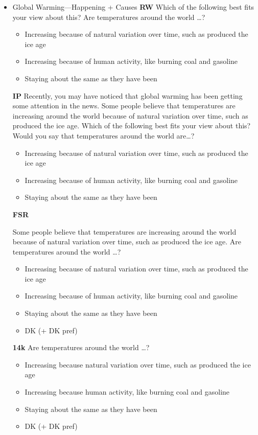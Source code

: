 \documentclass[12pt, letterpaper]{article}
\begin{document}
\begin{itemize}
\item Global Warming—Happening + Causes\newline
\textbf{RW}\newline
Which of the following best fits your view about this? Are temperatures around the
world \ldots?
\begin{itemize}
	\item Increasing because of natural variation over time, such as produced the ice age
	\item Increasing because of human activity, like burning coal and gasoline
	\item Staying about the same as they have been
\end{itemize}

\textbf{IP}\newline
Recently, you may have noticed that global warming has been getting some attention
in the news. Some people believe that temperatures are increasing around the world
because of natural variation over time, such as produced the ice age. Which of the
following best fits your view about this? Would you say that temperatures around the
world are\ldots?
\begin{itemize}
	\item Increasing because of natural variation over time, such as produced the ice age
	\item Increasing because of human activity, like burning coal and gasoline
	\item Staying about the same as they have been
\end{itemize}

\textbf{FSR}\newline 

Some people believe that temperatures are increasing around the world because of
natural variation over time, such as produced the ice age. Are temperatures around
the world \ldots?
\begin{itemize}
	\item Increasing because of natural variation over time, such as produced the ice age
	\item Increasing because of human activity, like burning coal and gasoline
	\item Staying about the same as they have been
	\item DK (+ DK pref)
\end{itemize}

\textbf{14k}\newline
Are temperatures around the world \ldots?
\begin{itemize}
	\item Increasing because natural variation over time, such as produced the ice age
	\item Increasing because human activity, like burning coal and gasoline
	\item Staying about the same as they have been
	\item DK (+ DK pref)
\end{itemize}


\end{itemize}
\end{document}
